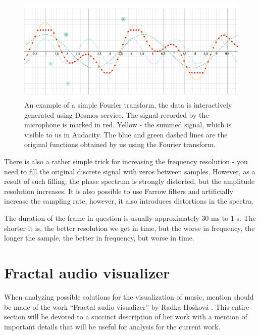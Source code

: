 \documentclass[thesis=B,english]{FITthesis}[2019/12/23]
\begin{document}
\begin{figure}[ht]
            \includegraphics[width=\textwidth]{desmos.png}
            \caption[An example of a simple Fourier transform]{An example of a simple Fourier transform, the data is interactively generated using Desmos service. \cite{desmos} The signal recorded by the microphone is marked in red. Yellow - the summed signal, which is visible to us in Audacity. The blue and green dashed lines are the original functions obtained by us using the Fourier transform.}
            \label{fig:desmos}
\end{figure}

\clearpage

There is also a rather simple trick for increasing the frequency resolution - you need to fill the original discrete signal with zeros between samples. However, as a result of such filling, the phase spectrum is strongly distorted, but the amplitude resolution increases. It is also possible to use Farrow filters and artificially increase the sampling rate, however, it also introduces distortions in the spectra.

The duration of the frame in question is usually approximately 30 ms to 1 s. The shorter it is, the better resolution we get in time, but the worse in frequency, the longer the sample, the better in frequency, but worse in time.

\section{Fractal audio visualizer}

When analyzing possible solutions for the visualization of music, mention should be made of the work “Fractal audio visualizer” by Radka Hošková \cite{fractal_visualizer}. This entire section will be devoted to a succinct description of her work with a mention of important details that will be useful for analysis for the current work.
\end{document}

